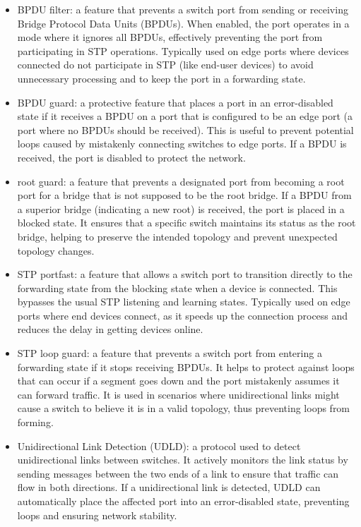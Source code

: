 \documentclass{article}
\begin{document}
\begin{itemize}
\item BPDU filter: a feature that prevents a switch port from sending or receiving Bridge Protocol Data Units (BPDUs). When enabled, the port operates in a mode where it ignores all BPDUs, effectively preventing the port from participating in STP operations. Typically used on edge ports where devices connected do not participate in STP (like end-user devices) to avoid unnecessary processing and to keep the port in a forwarding state.
\item BPDU guard: a protective feature that places a port in an error-disabled state if it receives a BPDU on a port that is configured to be an edge port (a port where no BPDUs should be received). This is useful to prevent potential loops caused by mistakenly connecting switches to edge ports. If a BPDU is received, the port is disabled to protect the network.
\item root guard: a feature that prevents a designated port from becoming a root port for a bridge that is not supposed to be the root bridge. If a BPDU from a superior bridge (indicating a new root) is received, the port is placed in a blocked state. It ensures that a specific switch maintains its status as the root bridge, helping to preserve the intended topology and prevent unexpected topology changes.
\item STP portfast:  a feature that allows a switch port to transition directly to the forwarding state from the blocking state when a device is connected. This bypasses the usual STP listening and learning states. Typically used on edge ports where end devices connect, as it speeds up the connection process and reduces the delay in getting devices online.
\item STP loop guard:  a feature that prevents a switch port from entering a forwarding state if it stops receiving BPDUs. It helps to protect against loops that can occur if a segment goes down and the port mistakenly assumes it can forward traffic. It is used in scenarios where unidirectional links might cause a switch to believe it is in a valid topology, thus preventing loops from forming.
\item Unidirectional Link Detection (UDLD): a protocol used to detect unidirectional links between switches. It actively monitors the link status by sending messages between the two ends of a link to ensure that traffic can flow in both directions. If a unidirectional link is detected, UDLD can automatically place the affected port into an error-disabled state, preventing loops and ensuring network stability.
\end{itemize}
\end{document}
